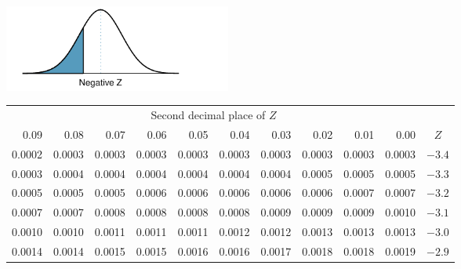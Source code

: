 \begin{table}[p]
\begin{center}{\small
\includegraphics[width=75mm]{extraTeX/tables/figures/normalTails/normalTailLeft} \vspace{2mm} \\
\begin{tabular}{| rrrrr | rrrrr | c}
  \cline{1-10}
&&& \multicolumn{4}{c}{Second decimal place of $Z$} &&& \\
  \cline{1-10}
0.09 &  0.08 &  0.07 &  0.06 &  0.05 &  0.04 &  0.03 &  0.02 &  0.01 &  0.00 & $Z$  \\
  \hline
  \hline
\footnotesize{0.0002} & \footnotesize{0.0003} & \footnotesize{0.0003} & \footnotesize{0.0003} & \footnotesize{0.0003} & \footnotesize{0.0003} & \footnotesize{0.0003} & \footnotesize{0.0003} & \footnotesize{0.0003} & \footnotesize{0.0003} & $-3.4$ \\
  \footnotesize{0.0003} & \footnotesize{0.0004} & \footnotesize{0.0004} & \footnotesize{0.0004} & \footnotesize{0.0004} & \footnotesize{0.0004} & \footnotesize{0.0004} & \footnotesize{0.0005} & \footnotesize{0.0005} & \footnotesize{0.0005} & $-3.3$ \\
  \footnotesize{0.0005} & \footnotesize{0.0005} & \footnotesize{0.0005} & \footnotesize{0.0006} & \footnotesize{0.0006} & \footnotesize{0.0006} & \footnotesize{0.0006} & \footnotesize{0.0006} & \footnotesize{0.0007} & \footnotesize{0.0007} & $-3.2$ \\
  \footnotesize{0.0007} & \footnotesize{0.0007} & \footnotesize{0.0008} & \footnotesize{0.0008} & \footnotesize{0.0008} & \footnotesize{0.0008} & \footnotesize{0.0009} & \footnotesize{0.0009} & \footnotesize{0.0009} & \footnotesize{0.0010} & $-3.1$ \\
  \footnotesize{0.0010} & \footnotesize{0.0010} & \footnotesize{0.0011} & \footnotesize{0.0011} & \footnotesize{0.0011} & \footnotesize{0.0012} & \footnotesize{0.0012} & \footnotesize{0.0013} & \footnotesize{0.0013} & \footnotesize{0.0013} & $-3.0$ \\
    \hline
    \hline
  \footnotesize{0.0014} & \footnotesize{0.0014} & \footnotesize{0.0015} & \footnotesize{0.0015} & \footnotesize{0.0016} & \footnotesize{0.0016} & \footnotesize{0.0017} & \footnotesize{0.0018} & \footnotesize{0.0018} & \footnotesize{0.0019} & $-2.9$ \\

\end{tabular}}
\end{center}
\end{table}
